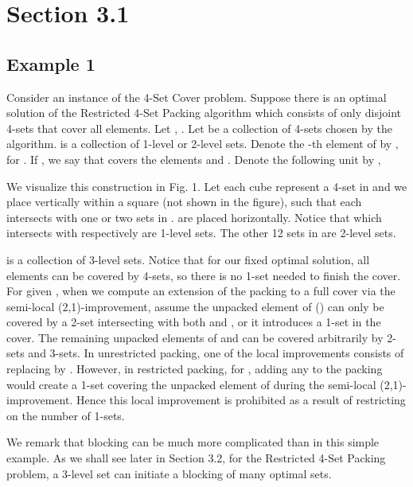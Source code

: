 \documentclass[runningheads,a4paper]{llncs}
\numberwithin{equation}{section}
\begin{document}
\section{Section 3.1}

\subsection{Example 1}

\begin{example}[Blocking]
Consider an instance  of the 4-Set Cover problem. Suppose there is an optimal solution  of the Restricted 4-Set Packing algorithm which consists of only disjoint 4-sets that cover all elements. Let , . Let  be a collection of 4-sets chosen by the algorithm.  is a collection of 1-level or 2-level sets. Denote the -th element of  by , for . If , we say that  covers the elements  and . Denote the following unit by ,



We visualize this construction in Fig. 1. Let each cube represent a 4-set in  and we place  vertically within a  square (not shown in the figure), such that each  intersects with one or two sets in .  are placed horizontally. Notice that  which intersects with  respectively are 1-level sets. The other 12 sets in  are 2-level sets.

 is a collection of 3-level sets. Notice that for our fixed optimal solution, all elements can be covered by 4-sets, so there is no 1-set needed to finish the cover. For given , when we compute an extension of the packing to a full cover via the semi-local (2,1)-improvement, assume the unpacked element of  () can only be covered by a 2-set intersecting with both  and , or it introduces a 1-set in the cover. The remaining unpacked elements of  and  can be covered arbitrarily by 2-sets and 3-sets. In unrestricted packing, one of the local improvements consists of replacing  by . However, in restricted packing, for , adding any  to the packing would create a 1-set covering the unpacked element of  during the semi-local (2,1)-improvement. Hence this local improvement is prohibited as a result of restricting on the number of 1-sets.

We remark that blocking can be much more complicated than in this simple example. As we shall see later in Section 3.2, for the Restricted 4-Set Packing problem, a 3-level set can initiate a blocking of many optimal sets.



\begin{figure}
\begin{center}


\end{center}
\end{figure}
\end{example}
\end{document}
